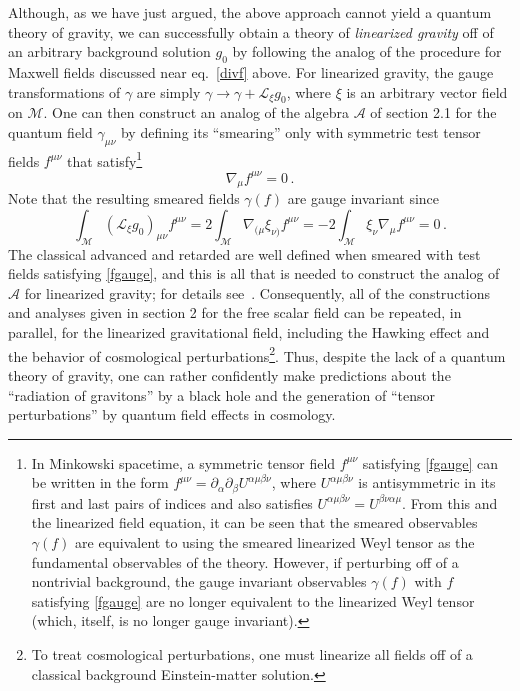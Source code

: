 \documentclass[12pt]{article}
\newcommand{\eA}{\mathscr{A}}
\newcommand{\M}{\mathscr{M}}
\renewcommand{\pounds}{{\mathscr L}}
\theoremstyle{plain}
\theoremstyle{definition}
\def\ben{\begin{equation}}
\def\een{\end{equation}}
\begin{document}
Although, as we have just argued, the above approach cannot yield a quantum theory of gravity, we can
successfully obtain a theory of {\it linearized gravity} off of an arbitrary background solution $g_0$
by following the analog of the procedure for Maxwell fields discussed near eq.~\eqref{divf} above. For linearized gravity,
the gauge transformations of $\gamma$ are simply $\gamma \to \gamma + \pounds_\xi g_0$, where $\xi$ is an
arbitrary vector field on $\M$. One can then construct an analog of the algebra $\eA$ of section 2.1
for the quantum field $\gamma_{\mu \nu}$ by defining its ``smearing'' only with symmetric
test tensor fields $f^{\mu \nu}$ that satisfy\footnote{In Minkowski spacetime, a symmetric tensor field $f^{\mu \nu}$ satisfying
\eqref{fgauge} can be written in the form $f^{\mu \nu} = \partial_\alpha \partial_\beta U^{\alpha \mu \beta \nu}$, where
$U^{\alpha \mu \beta \nu}$ is antisymmetric in its first and last pairs of indices and also satisfies $U^{\alpha \mu \beta \nu} = U^{\beta \nu \alpha \mu}$. From this and the linearized field equation, it can be seen that the smeared observables $\gamma(f)$ are equivalent to using the smeared linearized Weyl tensor as the fundamental observables
of the theory. However, if perturbing off of a nontrivial background, the gauge invariant observables $\gamma(f)$ with $f$ satisfying
\eqref{fgauge} are no longer equivalent to the linearized Weyl tensor (which, itself, is no longer gauge invariant).}
\ben
\nabla_\mu f^{\mu \nu} = 0 \, .
\label{fgauge}
\een
Note that the resulting smeared fields $\gamma(f)$ are gauge invariant since
\ben
\int_\M (\pounds_\xi g_0)_{\mu \nu} f^{\mu \nu} = 2 \int_\M \nabla_{(\mu} \xi_{\nu)} f^{\mu \nu} =
- 2 \int_\M \xi_\nu \nabla_\mu f^{\mu \nu} = 0 \, .
\een
The classical advanced and retarded are well defined when smeared with test fields satisfying \eqref{fgauge},
and this is all that is needed to construct the analog of $\eA$ for linearized gravity; for details see~\cite{fewster2}. Consequently, all of the 
constructions and analyses
given in section 2 for the free scalar field can be repeated, in parallel, for the linearized gravitational field, including the Hawking
effect and the behavior of cosmological perturbations\footnote{To treat cosmological perturbations, one must linearize all fields off of a classical background Einstein-matter solution.}. Thus, despite the lack of a quantum theory of gravity,
one can rather confidently make predictions about the ``radiation of gravitons'' by a black hole and the generation of
``tensor perturbations'' by quantum field effects in cosmology.
\end{document}

